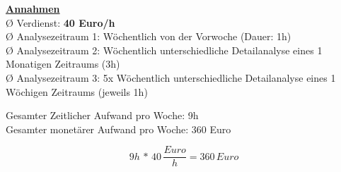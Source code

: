 	{
		\noindent
		\underline{\textbf{Annahmen}}\\
		Ø Verdienst: \textbf{40 Euro/h}\\
		Ø Analysezeitraum 1: Wöchentlich von der Vorwoche (Dauer: 1h)\\
		Ø Analysezeitraum 2: Wöchentlich unterschiedliche Detailanalyse eines 1 Monatigen Zeitraums (3h)\\
		Ø Analysezeitraum 3: 5x Wöchentlich unterschiedliche Detailanalyse eines 1 Wöchigen Zeitraums (jeweils 1h)\\

	}

	{
		\noindent
		Gesamter Zeitlicher Aufwand pro Woche: 9h\\
		Gesamter monetärer Aufwand pro Woche: 360 Euro

		\[ 9h\,*\,40\,\frac{Euro}{h} = 360\,Euro \]

	}